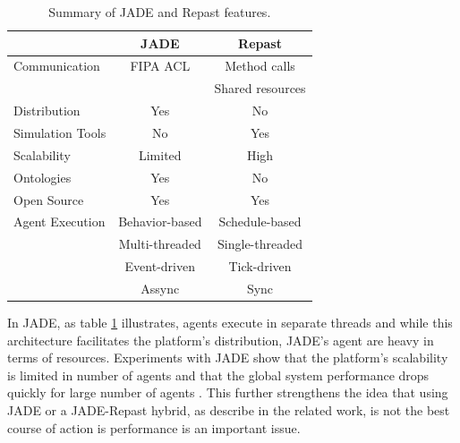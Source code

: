 \begin{table}[h]
	\caption{Summary of JADE and Repast features.}
	\label{tab:jadevsrep}
	\begin{center}
		\begin{tabular}{l|cc}
		\hline

		\hline
		\textbf{} & \textbf{JADE} & \textbf{Repast} \\ %
		\hline
			Communication & FIPA ACL &  Method calls  \\ %
						  &			 &  Shared resources \\
		\hline
			Distribution & Yes & No \\ %
		\hline
			Simulation Tools & No & Yes \\ %
		\hline
			Scalability & Limited & High \\ %
		\hline
			Ontologies & Yes & No \\ %
		\hline
			Open Source & Yes & Yes \\ %
		\hline
			Agent Execution & Behavior-based & Schedule-based  \\ %
							& Multi-threaded & Single-threaded \\ %
							& Event-driven   & Tick-driven 	   \\ %
							& Assync		 & Sync 		   \\ %
		\hline
		\end{tabular}
	\end{center}
\end{table}

In JADE, as table \ref{tab:jadevsrep} illustrates, agents execute in separate threads and while this architecture facilitates the platform's distribution, JADE's agent are heavy in terms of resources. Experiments with JADE show that the platform's scalability is limited in number of agents and that the global system performance drops quickly for large number of agents \cite{mengistu2008scalability} \cite{garcia2011misia}. This further strengthens the idea that using JADE or a JADE-Repast hybrid, as describe in the related work, is not the best course of action is performance is an important issue.


